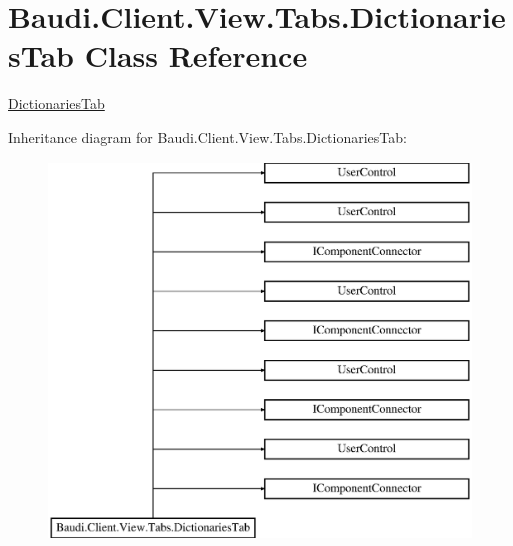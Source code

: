\hypertarget{class_baudi_1_1_client_1_1_view_1_1_tabs_1_1_dictionaries_tab}{}\section{Baudi.\+Client.\+View.\+Tabs.\+Dictionaries\+Tab Class Reference}
\label{class_baudi_1_1_client_1_1_view_1_1_tabs_1_1_dictionaries_tab}


\hyperlink{class_baudi_1_1_client_1_1_view_1_1_tabs_1_1_dictionaries_tab}{Dictionaries\+Tab}  


Inheritance diagram for Baudi.\+Client.\+View.\+Tabs.\+Dictionaries\+Tab\+:\begin{figure}[H]
\begin{center}
\leavevmode
\includegraphics[height=10.000000cm]{class_baudi_1_1_client_1_1_view_1_1_tabs_1_1_dictionaries_tab}
\end{center}
\end{figure}
